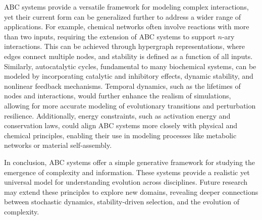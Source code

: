 \documentclass[entropy,article,submit,pdftex,oneauthor]{Definitions/mdpi}
\begin{document}
ABC systems provide a versatile framework for modeling complex interactions, yet their current form can be generalized further to address a wider range of applications. For example, chemical networks often involve reactions with more than two inputs, requiring the extension of ABC systems to support \( n \)-ary interactions. This can be achieved through hypergraph representations, where edges connect multiple nodes, and stability is defined as a function of all inputs. Similarly, autocatalytic cycles, fundamental to many biochemical systems, can be modeled by incorporating catalytic and inhibitory effects, dynamic stability, and nonlinear feedback mechanisms. Temporal dynamics, such as the lifetimes of nodes and interactions, would further enhance the realism of simulations, allowing for more accurate modeling of evolutionary transitions and perturbation resilience. Additionally, energy constraints, such as activation energy and conservation laws, could align ABC systems more closely with physical and chemical principles, enabling their use in modeling processes like metabolic networks or material self-assembly.

In conclusion, ABC systems offer a simple generative framework for studying the emergence of complexity and information. These systems provide a realistic yet universal model for understanding evolution across disciplines. Future research may extend these principles to explore new domains, revealing deeper connections between stochastic dynamics, stability-driven selection, and the evolution of complexity.
\end{document}
